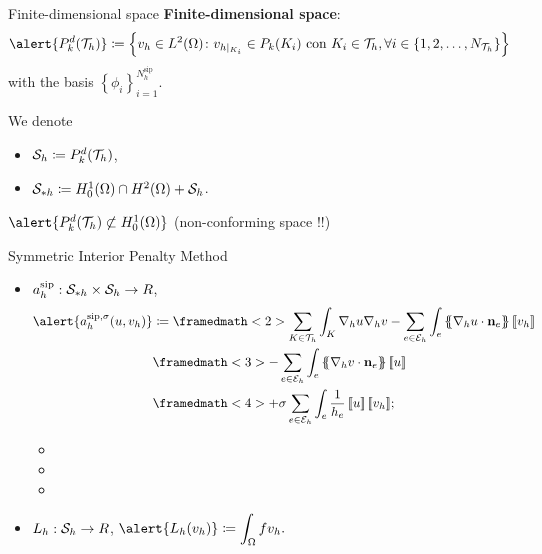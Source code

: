 \begin{frame}{Finite-dimensional space}
\textbf{Finite-dimensional space}:{\small $$\alert{\mathbb{P}_k^d(\T_h)}\coloneqq\left\{v_h\in L^2(\Omega)\colon v_{h|_{K_i}}\in\mathbb{P}_k(K_i)\text{ con } K_i\in\T_h,\forall i\in\left\{1,2,\ldots,N_{\T_h}\right\}\right\}$$ with the basis $\left\{\phi_i\right\}_{i=1}^{N_h^{\text{sip}}}$.}
\vspace*{1cm}

We denote
\begin{itemize}\itemsep1em
\item $\S_h\coloneqq\mathbb{P}_k^d(\T_h)$,
\item $\S_{*h}\coloneqq H^1_0(\Omega)\cap H^2(\Omega)+\S_h$.
\end{itemize}
\vspace*{1cm}
\pause
$\alert{\mathbb{P}_k^d(\T_h)\not\subset H_0^1(\Omega)}$ (non-conforming space \alert{!!})
\end{frame}

\begin{frame}{Symmetric Interior Penalty Method}
	\scriptsize
\begin{itemize}\itemsep1em
	\item $a_h^{\text{sip}}:\S_{*h}\times \S_h\to\R$,
	\begin{equation*}
	\label{forma_bilineal_DG}
	\begin{aligned}
	\alert{\asip{u}{v_h}}&\coloneqq \framedmath<2>{\displaystyle \sum_{K\in\T_h}\int_K\nabla_h u\nabla_h v-\sum_{e\in\E_h}\int_e\media{\nabla_h u\cdot\mathbf{n}_e}\salto{v_h}}\\&\framedmath<3>{\displaystyle -\sum_{e\in\E_h}\int_e\media{\nabla_h v\cdot\mathbf{n}_e}\salto{u}}\\&\framedmath<4>{\displaystyle +\sigma\sum_{e\in\E_h}\int_e\frac{1}{h_e}\salto{u}\salto{v_h}};
	\end{aligned}
	\end{equation*}
	\begin{itemize}
		\item<2> 
		\item<3> 
		\item<4> 
	\end{itemize}
	\item $L_h:\S_h\to\R$, $\displaystyle \alert{L_h(v_h)}\coloneqq \int_\Omega f v_h.$
\end{itemize}

\end{frame}

